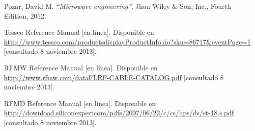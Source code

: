 \documentclass[12pt,graphicx,caption,rotating]{article}
\begin{document}
\begin{thebibliography}{99}
 
  Pozar, David M.
 {\em "`Microwave engineering"'}.
 Jhon Wiley \& Son, Inc., Fourth Edition, 2012.

  Tessco Reference Manual [en línea]. Disponible en \url{http://www.tessco.com/productsdisplayProductInfo.do?sku=86717&eventPage=1} [consultado 8 noviembre 2013].
 
  RFMW Reference Manual [en línea]. Disponible en \url{http://www.rfmw.com/dataFLRF-CABLE-CATALOG.pdf} [consultado 8 noviembre 2013].
 
 RFMD Reference Manual [en línea]. Disponible en \url{http://download.siliconexpertcom/pdfs/2007/06/22/c/cs/hps/ds/st-18.s.pdf} [consultado 8 noviembre 2013].
 
\end{thebibliography}
\end{document}
